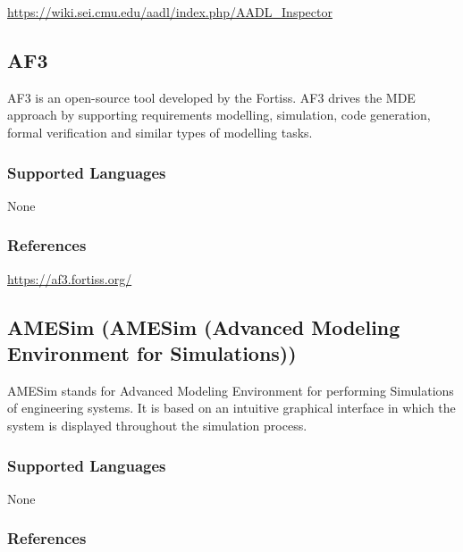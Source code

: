 \url{https://wiki.sei.cmu.edu/aadl/index.php/AADL_Inspector}



\subsection{AF3}
\label{subsecT:AF3}

AF3 is an open-source tool developed by the Fortiss. 
AF3 drives the MDE approach by supporting requirements modelling, simulation, code generation, formal verification and similar types of modelling tasks.



\subsubsection{Supported Languages}

None


\subsubsection{References}

\url{https://af3.fortiss.org/}



\subsection{AMESim (AMESim (Advanced Modeling Environment for Simulations))}
\label{subsecT:AMESim}

AMESim stands for Advanced Modeling Environment for performing Simulations of engineering systems. It is based on an intuitive graphical interface in which the system is displayed throughout the simulation process.

\subsubsection{Supported Languages}

None


\subsubsection{References}





